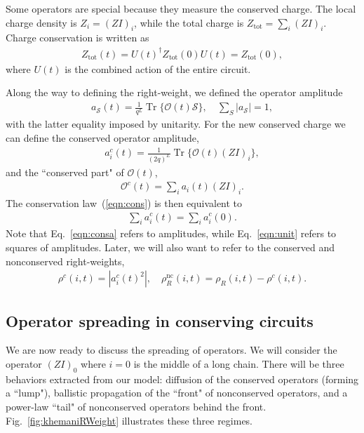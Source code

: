 \documentclass[a4paper,12pt]{article}
\renewcommand{\cal}{\mathcal}
\renewcommand{\th}[1]{\frac{1}{#1}}
\newcommand{\abs}[1]{\left| #1 \right|}
\renewcommand{\S}{\mathcal{S}}
\newcommand{\nc}{\text{nc}}
\newcommand{\tot}{\text{tot}}
\DeclareMathOperator{\Tr}{Tr}
\begin{document}
Some operators are special because they measure the conserved charge. The local charge density is $Z_i=(ZI)_i$, while the total charge is $Z_\tot=\sum_i(ZI)_i$. Charge conservation is written as 
\begin{align}
Z_\tot(t) = U(t)^\dag Z_\tot(0)U(t) = Z_\tot(0), \label{eqn:cons}
\end{align}
where $U(t)$ is the combined action of the entire circuit.

Along the way to defining the right-weight, we defined the operator amplitude
\begin{align}
a_\S(t) = \th{q^L}\Tr\{ \cal{O}(t)\S \},\quad \sum_S\abs{a_\S} = 1, \label{eqn:unit}
\end{align}
with the latter equality imposed by unitarity. For the new conserved charge we can define the conserved operator amplitude,
\begin{align}
a_i^c(t) = \th{(2q)^{L}}\Tr\{\cal{O}(t)(ZI)_i\},
\end{align}
and  the ``conserved part" of $\cal{O}(t)$,
\begin{align}
\cal{O}^c(t)=\sum_i a_i(t)(ZI)_i.
\end{align}
The conservation law~(\ref{eqn:cons}) is then equivalent to 
\begin{align}
\sum_i a_i^c(t)=\sum_i a_i^c(0). \label{eqn:consa}
\end{align}
Note that Eq.~\ref{eqn:consa} refers to amplitudes, while Eq.~\ref{eqn:unit} refers to squares of amplitudes. Later, we will also want to refer to the conserved and nonconserved right-weights, 
\begin{align}
\rho^c(i,t) = \abs{a^c_i(t)^2}, \quad \rho_R^\nc(i,t) = \rho_R(i,t)- 
	\rho^c(i,t).
\end{align}

\subsection{Operator spreading in conserving circuits} \label{sub:consop}

We are now ready to discuss the spreading of operators. We will consider the operator $(ZI)_0$ where $i=0$ is the middle of a long chain. There will be three behaviors extracted from our model: diffusion of the conserved operators (forming a ``lump"), ballistic propagation of the ``front" of nonconserved operators, and a power-law ``tail" of nonconserved operators behind the front. Fig.~\ref{fig:khemaniRWeight} illustrates these three regimes.
\end{document}
